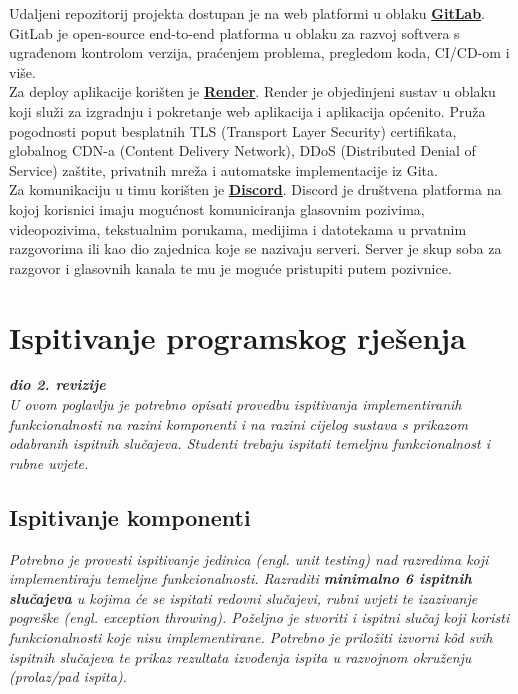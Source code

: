 			Udaljeni repozitorij projekta dostupan je na web platformi u oblaku \textbf{\href{https://gitlab.com/}{GitLab}}. GitLab je open-source end-to-end platforma u oblaku za razvoj softvera s ugrađenom kontrolom verzija, praćenjem problema, pregledom koda, CI/CD-om i više.\\
			Za deploy aplikacije korišten je \textbf{\href{https://render.com/}{Render}}. Render je objedinjeni sustav u oblaku koji služi za izgradnju i pokretanje web aplikacija i aplikacija općenito. Pruža pogodnosti poput besplatnih TLS (Transport Layer Security) certifikata, globalnog CDN-a (Content Delivery Network), DDoS (Distributed Denial of Service) zaštite, privatnih mreža i automatske implementacije iz Gita.\\
			Za komunikaciju u timu korišten je \textbf{\href{https://discord.com/}{Discord}}. Discord je društvena platforma na kojoj korisnici imaju mogućnost komuniciranja glasovnim pozivima, videopozivima, tekstualnim porukama, medijima i datotekama u prvatnim razgovorima ili kao dio zajednica koje se nazivaju serveri. Server je skup soba za razgovor i glasovnih kanala te mu je moguće pristupiti putem pozivnice.\\
			
			
			\eject 
		
	
		\section{Ispitivanje programskog rješenja}
			
			\textbf{\textit{dio 2. revizije}}\\
			
			 \textit{U ovom poglavlju je potrebno opisati provedbu ispitivanja implementiranih funkcionalnosti na razini komponenti i na razini cijelog sustava s prikazom odabranih ispitnih slučajeva. Studenti trebaju ispitati temeljnu funkcionalnost i rubne uvjete.}
	
			
			\subsection{Ispitivanje komponenti}
			\textit{Potrebno je provesti ispitivanje jedinica (engl. unit testing) nad razredima koji implementiraju temeljne funkcionalnosti. Razraditi \textbf{minimalno 6 ispitnih slučajeva} u kojima će se ispitati redovni slučajevi, rubni uvjeti te izazivanje pogreške (engl. exception throwing). Poželjno je stvoriti i ispitni slučaj koji koristi funkcionalnosti koje nisu implementirane. Potrebno je priložiti izvorni kôd svih ispitnih slučajeva te prikaz rezultata izvođenja ispita u razvojnom okruženju (prolaz/pad ispita). }
			
